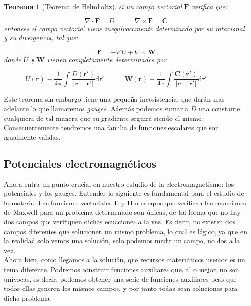 \documentclass[12pt,a4paper]{article}
\newcommand{\D}{\mathrm{d}}
\newcommand{\tquad}{\quad \quad \quad}
\newcommand{\rota}{\nabla \times}
\newcommand{\dive}{\nabla \cdot}
\newcommand{\Bn}{\mathbf{B}}
\newcommand{\En}{\mathbf{E}}
\newcommand{\Fn}{\mathbf{F}}
\newcommand{\rn}{\mathbf{r}}
\newcommand{\Cn}{\mathbf{C}}
\newcommand{\Wn}{\mathbf{W}}
\newtheorem{theorem}{Teorema}[section]
\numberwithin{equation}{section}
\numberwithin{figure}{section}
\begin{document}
\begin{theorem}[Teorema de Helmholtz]
si un campo vectorial $\Fn$ verifica que:

\begin{equation}
\dive \Fn = D \tquad \rota \Fn = \Cn
\end{equation}
entonces el campo vectorial viene inequívocamente determinado por su rotacional y su divergencia, tal que:

\begin{equation}
\Fn = - \nabla  U + \rota \Wn
\end{equation}
donde $U$ y $\Wn$ vienen completamente determinados por

\begin{equation}
U(\rn) \equiv \dfrac{1}{4 \pi} \int \dfrac{D (\rn')}{|\rn - \rn'|} \D \tau' \tquad 
\Wn (\rn) \equiv \dfrac{1}{4 \pi}  \int \dfrac{\Cn (\rn')}{|\rn - \rn'|} \D \tau' \tquad 
\end{equation}
\end{theorem}

Este teorema sin embargo tiene una pequeña incosistencia, que darán mas adelante lo que llamaremos \textit{gauges}. Además podemos sumar a $D$ una constante cualquiera de tal manera que su gradiente seguirá siendo el mismo. Consecuentemente tendremos una familia de funciones escalares que son igualmente válidas. 


\subsection{Potenciales electromagnéticos}

Ahora entra un punto crucial en nuestro estudio de la electromagnetismo: los potenciales y los gauges. Entender lo siguiente es fundamental para el estudio de la materia. Las funciones vectoriales $\En$ y $\Bn$ o campos que verifican las ecuaciones de Maxwell para un problema determinado son únicas, de tal forma que no hay dos campos que verifiquen dichas ecuaciones a la vez. Es decir, no existen dos campos diferentes que solucionen un mismo problema, lo cual es lógico, ya que en la realidad solo vemos una solución, solo podemos medir un campo, no dos a la vez. \\

Ahora bien, como llegamos a la solución, que recursos matemáticos usemos es un tema diferente. Podremos construir funciones auxiliares que, al o mejor, no son unívocas, es decir, podemos obtener una serie de funciones auxiliares pero que todas ellas generen los mismos campos, y por tanto todas sean soluciones para dicho problema. \\
\end{document}
